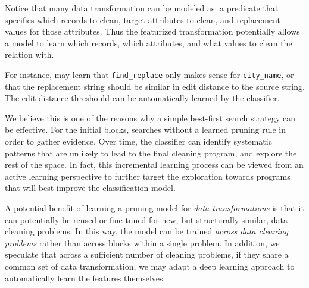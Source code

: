 Notice that many data transformation can be modeled as: a predicate that specifies which records to clean, target attributes to clean, and replacement values for those attributes.  Thus the featurized transformation potentially allows a model to learn which records, which attributes, and what values to clean the relation with.  

For instance, \sys may learn that \texttt{find\_replace} only makes sense for \texttt{city\_name}, or that the replacement string should be similar in edit distance to the source string.  The edit distance threshould can be automatically learned by the classifier.  


 We believe this is one of the reasons why a simple best-first search strategy can be effective.  For the initial blocks, \sys searches without a learned pruning rule in order to gather evidence.  Over time, the classifier can identify systematic patterns that are unlikely to lead to the final cleaning program, and explore the rest of the space.  In fact, this incremental learning process can be viewed from an active learning perspective to further target the exploration towards programs that will best improve the classification model.  

A potential benefit of learning a pruning model for {\it data transformations} is that it can potentially be reused or fine-tuned for new, but structurally similar, data cleaning problems. In this way, the model can be trained {\it across data cleaning problems} rather than across blocks within a single problem.    In addition, we speculate that across a sufficient number of cleaning problems, if they share a common set of data transformation, we may adapt a deep learning approach to automatically learn the features themselves.  







